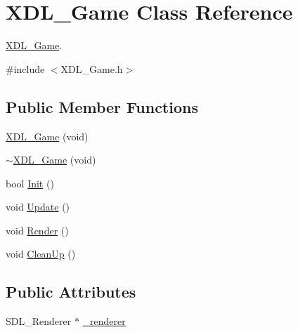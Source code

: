 \hypertarget{class_x_d_l___game}{\section{X\-D\-L\-\_\-\-Game Class Reference}
\label{class_x_d_l___game}
}


\hyperlink{class_x_d_l___game}{X\-D\-L\-\_\-\-Game}.  




{\ttfamily \#include $<$X\-D\-L\-\_\-\-Game.\-h$>$}

\subsection*{Public Member Functions}
\begin{DoxyCompactItemize}
\item 
\hyperlink{class_x_d_l___game_a7dbac78db43464ec6abf72cc0b83798c}{X\-D\-L\-\_\-\-Game} (void)
\item 
\hyperlink{class_x_d_l___game_ae74cceb6cbe74cdaefcc0c69ad0e88f2}{$\sim$\-X\-D\-L\-\_\-\-Game} (void)
\item 
bool \hyperlink{class_x_d_l___game_ab866479bed0d2d4ab2d8c40b8d2b1206}{Init} ()
\item 
void \hyperlink{class_x_d_l___game_afca16922cbee9332ac6b8fabf8078c4d}{Update} ()
\item 
void \hyperlink{class_x_d_l___game_a8259b7f7bc74722f423e0392cebef188}{Render} ()
\item 
void \hyperlink{class_x_d_l___game_a03405ef0205b25414b86d833cb4cd562}{Clean\-Up} ()
\end{DoxyCompactItemize}
\subsection*{Public Attributes}
\begin{DoxyCompactItemize}
\item 
S\-D\-L\-\_\-\-Renderer $\ast$ \hyperlink{class_x_d_l___game_a64e272606ee7d43ab1669794c098c2c4}{\-\_\-renderer}
\end{DoxyCompactItemize}
